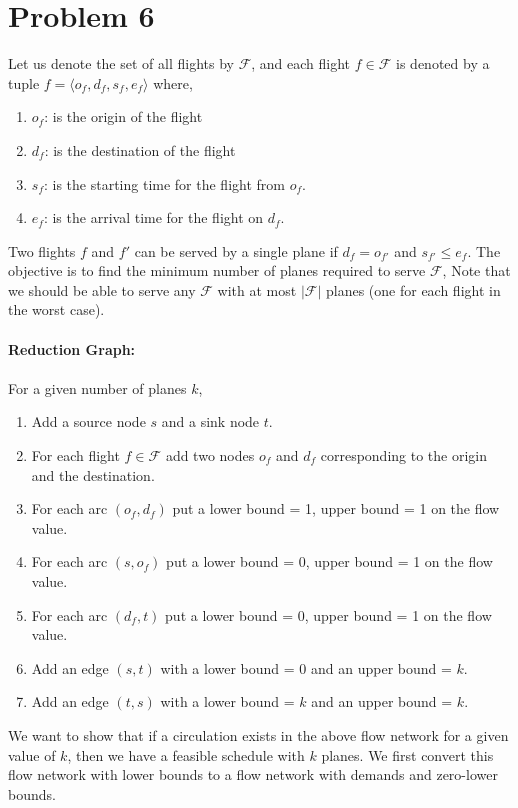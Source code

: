 \documentclass{article}
\begin{document}
    \section{Problem 6}
        Let us denote the set of all flights by $\mathcal{F}$, and each flight $f \in \mathcal{F}$ is denoted by a tuple $f = \langle o_f, d_f, s_f, e_f\rangle$ where, 
        \begin{enumerate}
            \item $o_f$: is the origin of the flight 
            \item $d_f$: is the destination of the flight
            \item $s_f$: is the starting time for the flight from $o_f$. 
            \item $e_f$: is the arrival time for the flight on $d_f$. 
        \end{enumerate}
        Two flights $f$ and $f'$ can be served by a single plane if $d_f = o_{f'}$ and $s_{f'} \leq e_{f}$. The objective is to find the minimum number of planes required to serve $\mathcal{F}$, Note that we should be able to serve any $\mathcal{F}$ with at most $|\mathcal{F}|$ planes (one for each flight in the worst case).\\\\
        \textbf{Reduction Graph:}\\\\
        For a given number of planes $k$, 
        \begin{enumerate}
            \item Add a source node $s$ and a sink node $t$. 
            \item For each flight $f\in \mathcal{F}$ add two nodes $o_f$ and $d_f$ corresponding to the origin and the destination. 
            \item For each arc $(o_f, d_f)$ put a lower bound = 1, upper bound = 1 on the flow value. 
            \item For each arc $(s, o_f)$ put a lower bound = 0, upper bound = 1 on the flow value. 
            \item For each arc $(d_f, t)$ put a lower bound = 0, upper bound = 1 on the flow value. 
            \item Add an edge $(s, t)$ with a lower bound = 0 and an upper bound = $k$. 
            \item Add an edge $(t, s)$ with a lower bound = $k$ and an upper bound = $k$. 
        \end{enumerate}
        We want to show that if a circulation exists in the above flow network for a given value of $k$, then we have a feasible schedule with $k$ planes. We first convert this flow network with lower bounds to a flow network with demands and zero-lower bounds.\\\\
\end{document}

